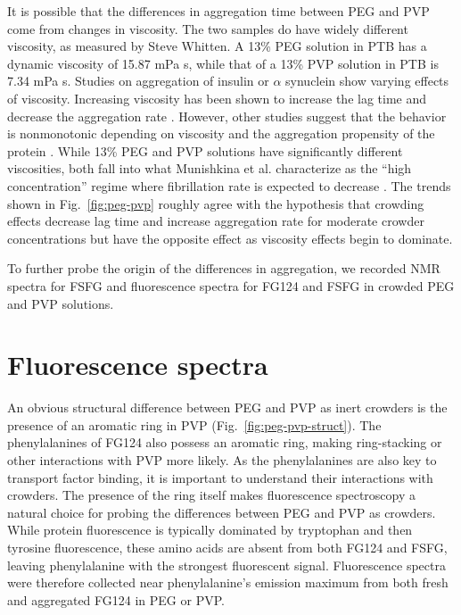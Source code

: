 It is possible that the differences in aggregation time between PEG and PVP come from changes in viscosity.  The two samples do have widely different viscosity, as measured by Steve Whitten.  A 13\% PEG solution in PTB has a dynamic viscosity of 15.87 mPa s, while that of a 13\% PVP solution in PTB is 7.34 mPa s.  Studies on aggregation of insulin or $\alpha$ synuclein show varying effects of viscosity.  Increasing viscosity has been shown to increase the lag time and decrease the aggregation rate \cite{saha16,sleutel12}.  However, other studies suggest that the behavior is nonmonotonic depending on viscosity and the aggregation propensity of the protein \cite{munishkina04, magno10}.  While 13\% PEG and PVP solutions have significantly different viscosities, both fall into what Munishkina et al. characterize as the ``high concentration'' regime where fibrillation rate is expected to decrease \cite{munishkina04}.  The trends shown in Fig.~\ref{fig:peg-pvp} roughly agree with the hypothesis that crowding effects decrease lag time and increase aggregation rate for moderate crowder concentrations but have the opposite effect as viscosity effects begin to dominate.

To further probe the origin of the differences in aggregation, we recorded NMR spectra for FSFG and fluorescence spectra for FG124 and FSFG in crowded PEG and PVP solutions.

\section{Fluorescence spectra}

An obvious structural difference between PEG and PVP as inert crowders is the presence of an aromatic ring in PVP (Fig.~\ref{fig:peg-pvp-struct}).  The phenylalanines of FG124 also possess an aromatic ring, making ring-stacking or other interactions with PVP more likely.  As the phenylalanines are also key to transport factor binding, it is important to understand their interactions with crowders.  The presence of the ring itself makes fluorescence spectroscopy a natural choice for probing the differences between PEG and PVP as crowders.  While protein fluorescence is typically dominated by tryptophan and then tyrosine fluorescence, these amino acids are absent from both FG124 and FSFG, leaving phenylalanine with the strongest fluorescent signal.  Fluorescence spectra were therefore collected near phenylalanine's emission maximum from both fresh and aggregated FG124 in PEG or PVP.

